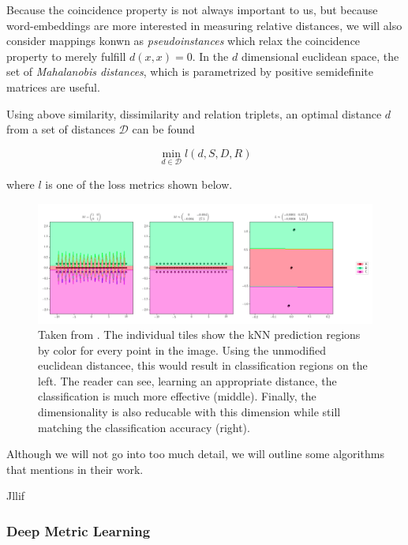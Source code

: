 \documentclass[a4paper,12pt,twoside,openright]{report}
\begin{document}
Because the coincidence property is not always important to us, but because word-embeddings are more interested in measuring relative distances, we will also consider mappings konwn as \textit{pseudoinstances} which relax the coincidence property to merely fulfill $d(x, x) = 0$.
In the $d$ dimensional euclidean space, the set of \textit{Mahalanobis distances}, which is parametrized by positive semidefinite matrices are useful.

Using above similarity, dissimilarity and relation triplets, an optimal distance $d$ from a set of distances $\mathcal{D}$ can be found

\begin{equation}
\min_{d \in \mathcal{D}} l (d, S, D, R)
\end{equation}

where $l$ is one of the loss metrics shown below.



\begin{figure}[h]
	\center
  \includegraphics[width=\linewidth]{./assets/relatedwork/metric_learning_example.png}
  \caption{Taken from \cite{suarez19}. The individual tiles show the kNN prediction regions by color for every point in the image. Using the unmodified euclidean distancee, this would result in classification regions on the left. The reader can see, learning an appropriate distance, the classification is much more effective (middle). Finally, the dimensionality is also reducable with this dimension while still matching the classification accuracy (right).}
  \label{fig:BERT_vanilla_pipeline}
\end{figure}

Although we will not go into too much detail, we will outline some algorithms that \cite{suarez19} mentions in their work.

Jllif



\subsubsection{Deep Metric Learning}
\end{document}
